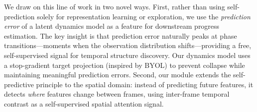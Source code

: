 We draw on this line of work in two novel ways. First, rather than using self-prediction solely for representation learning or exploration, we use the \emph{prediction error} of a latent dynamics model as a feature for downstream progress estimation. The key insight is that prediction error naturally peaks at phase transitions---moments when the observation distribution shifts---providing a free, self-supervised signal for temporal structure discovery. Our dynamics model uses a stop-gradient target projection (inspired by BYOL) to prevent collapse while maintaining meaningful prediction errors. Second, our \fasa{} module extends the self-predictive principle to the spatial domain: instead of predicting future features, it detects \emph{where} features change between frames, using inter-frame temporal contrast as a self-supervised spatial attention signal.
